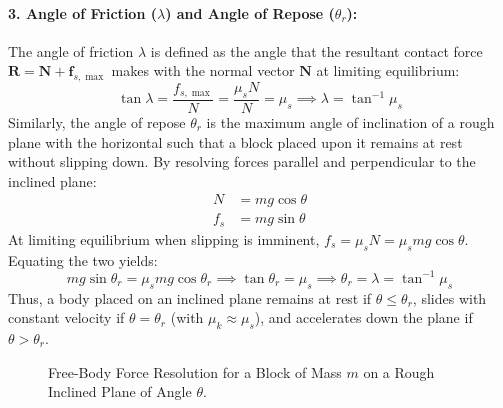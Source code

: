 \documentclass[10pt,twoside,openright]{book}
\begin{document}
\paragraph{3. Angle of Friction ($\lambda$) and Angle of Repose ($\theta_r$):}
The angle of friction $\lambda$ is defined as the angle that the resultant contact force $\mathbf{R} = \mathbf{N} + \mathbf{f}_{s,\max}$ makes with the normal vector $\mathbf{N}$ at limiting equilibrium:
\begin{equation}
  \tan\lambda = \frac{f_{s,\max}}{N} = \frac{\mu_s N}{N} = \mu_s \implies \lambda = \tan^{-1}\mu_s
\end{equation}
Similarly, the angle of repose $\theta_r$ is the maximum angle of inclination of a rough plane with the horizontal such that a block placed upon it remains at rest without slipping down. By resolving forces parallel and perpendicular to the inclined plane:
\begin{align}
  N &= mg\cos\theta \\
  f_s &= mg\sin\theta
\end{align}
At limiting equilibrium when slipping is imminent, $f_s = \mu_s N = \mu_s mg\cos\theta$. Equating the two yields:
\begin{equation}
  mg\sin\theta_r = \mu_s mg\cos\theta_r \implies \tan\theta_r = \mu_s \implies \theta_r = \lambda = \tan^{-1}\mu_s
\end{equation}
Thus, a body placed on an inclined plane remains at rest if $\theta \le \theta_r$, slides with constant velocity if $\theta = \theta_r$ (with $\mu_k \approx \mu_s$), and accelerates down the plane if $\theta > \theta_r$.

\begin{figure}[htbp]
\centering
{}
\caption{Free-Body Force Resolution for a Block of Mass $m$ on a Rough Inclined Plane of Angle $\theta$.}
\label{fig:incline_fbd}
\end{figure}
\end{document}

